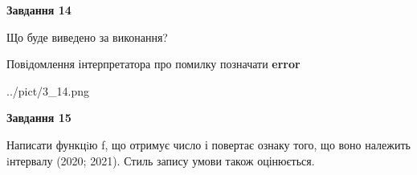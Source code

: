 \documentclass[11pt, ukrainian]{article}
\begin{document}
{\begin {large}
{\begin {center}\textbf{Завдання 14}\end {center}}\par
Що буде виведено за виконання? \par
Повідомлення інтерпретатора про помилку позначати \textbf{error}

\begin{center}
	{../pict/3_14.png}
\end{center}
\newpage

{\begin {center}\textbf{Завдання 15}\end {center}}\par

Написати функцiю f, що отримує число і повертає ознаку того, що воно належить iнтервалу (2020; 2021). Стиль запису умови також оцінюється.\par
\newpage

\end {large}}
\end{document}
